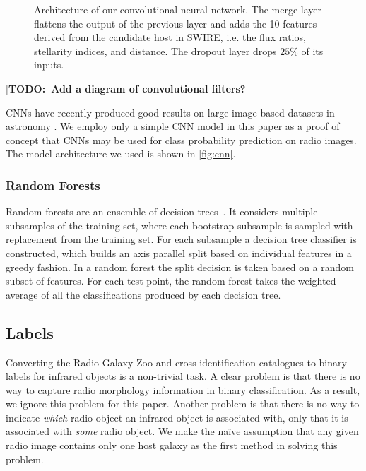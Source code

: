 \documentclass[fleqn,usenatbib,usedcolumn]{mnras}
\newcommand{\todo}[1]{ {\color{red}[{\bf TODO:~{#1}}]} }
\begin{document}
\begin{figure}
        \caption{Architecture of our convolutional neural network. The merge
          layer flattens the output of the previous layer and adds the 10
          features derived from the candidate host in SWIRE, i.e. the flux
          ratios, stellarity indices, and distance. The dropout layer drops
          $25\%$ of its inputs.}
        \label{fig:cnn}
      \end{figure}

      \todo{Add a diagram of convolutional filters?}

      CNNs have recently produced good results on large image-based datasets in
      astronomy \citep[e.g.][]{dieleman15cnn, lukic17compact}. We employ only a
      simple CNN model in this paper as a proof of concept that CNNs may be used
      for class probability prediction on radio images. The model architecture
      we used is shown in \autoref{fig:cnn}.

    \subsubsection{Random Forests}
    \label{sec:random-forests}

      Random forests are an ensemble of decision
      trees~\citep{breiman01random-forest}. It considers multiple subsamples
      of the training set, where each bootstrap subsample is sampled with
      replacement from the training set. For each subsample a decision tree
      classifier is constructed, which builds an axis parallel split based on
      individual features in a greedy fashion. In a random forest the split
      decision is taken based on a random subset of features. For each test
      point, the random forest takes the weighted average of all the
      classifications produced by each decision tree.

  \subsection{Labels}\label{labels}

    Converting the Radio Galaxy Zoo and \citet{norris06} cross-identification
    catalogues to binary labels for infrared objects is a non-trivial task. A
    clear problem is that there is no way to capture radio morphology
    information in binary classification. As a result, we ignore this problem
    for this paper. Another problem is that there is no way to indicate
    \emph{which} radio object an infrared object is associated with, only that
    it is associated with \emph{some} radio object. We make the na\"ive
    assumption that any given radio image contains only one host galaxy as the
    first method in solving this problem.
\end{document}
